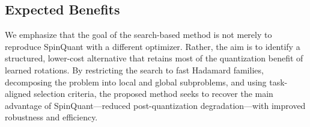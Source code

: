 \documentclass[11pt]{article}
\begin{document}
\subsection{Expected Benefits}
We emphasize that the goal of the search-based method is not merely to reproduce SpinQuant with a different optimizer. Rather, the aim is to identify a structured, lower-cost alternative that retains most of the quantization benefit of learned rotations. By restricting the search to fast Hadamard families, decomposing the problem into local and global subproblems, and using task-aligned selection criteria, the proposed method seeks to recover the main advantage of SpinQuant---reduced post-quantization degradation---with improved robustness and efficiency.
\end{document}

